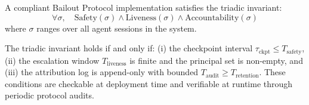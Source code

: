 \begin{corollary}
A compliant Bailout Protocol implementation satisfies the triadic invariant:
\begin{equation}
\forall \sigma,\quad \text{Safety}(\sigma) \land \text{Liveness}(\sigma) \land \text{Accountability}(\sigma)
\end{equation}
where $\sigma$ ranges over all agent sessions in the system.
\end{corollary}

The triadic invariant holds if and only if: (i) the checkpoint interval $\tau_{\text{ckpt}} \leq T_{\text{safety}}$, (ii) the escalation window $T_{\text{liveness}}$ is finite and the principal set is non-empty, and (iii) the attribution log is append-only with bounded $T_{\text{audit}} \geq T_{\text{retention}}$. These conditions are checkable at deployment time and verifiable at runtime through periodic protocol audits.

